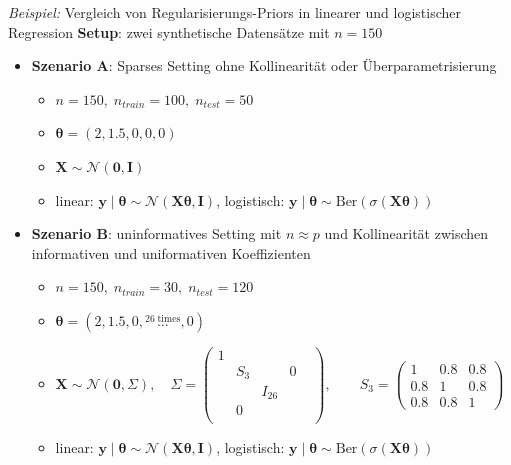 \documentclass[
  ignorenonframetext,
  aspectratio=169,
]{beamer}
\providecommand{\tightlist}{%
  \setlength{\itemsep}{0pt}\setlength{\parskip}{0pt}}
\newcommand{\bnull}{\bm{0}}
\newcommand{\by}{\bm{y}}
\newcommand{\bI}{\bm{I}}
\newcommand{\bX}{\bm{X}}
\newcommand{\Ncal}{\mathcal{N}}
\newcommand{\Sd}{\Sigma}
\newcommand{\btheta}{\bm{\theta}}
\begin{document}
\begin{frame}{\emph{Beispiel:} Vergleich von Regularisierungs-Priors in
linearer und logistischer Regression}
\protect{}\label{beispiel-vergleich-von-regularisierungs-priors-in-linearer-und-logistischer-regression}
\textbf{Setup}: zwei synthetische Datensätze mit \(n=150\)

\begin{itemize}
\tightlist
\item
  \textbf{Szenario A}: Sparses Setting ohne Kollinearität oder
  Überparametrisierung

  \begin{itemize}
  \tightlist
  \item
    \(n = 150,\; n_{train} = 100,\;n_{test} = 50\)
  \item
    \(\btheta = (2, 1.5, 0, 0, 0)\)
  \item
    \(\bX \sim \Ncal(\bnull, \bI)\)
  \item
    linear: \(\by \mid \btheta \sim \Ncal(\bX \btheta,\bI)\),
    logistisch:
    \(\by \mid \btheta \sim \text{Ber}(\sigma(\bX \btheta))\)
  \end{itemize}
\item
  \textbf{Szenario B}: uninformatives Setting mit \(n \approx p\) und
  Kollinearität zwischen informativen und uniformativen Koeffizienten

  \begin{itemize}
  \tightlist
  \item
    \(n = 150,\; n_{train} = 30,\;n_{test} = 120\)
  \item
    \(\btheta = (2, 1.5, 0, \overset{26\; \text{times}}{\dots}, 0)\)
  \item
    \(\bX \sim \Ncal(\bnull, \Sd), \quad \Sd = \begin{pmatrix} 1 &        &         &        &        \\ & \!\!S_3\!\! &        & 0      &        \\ &        & I_{26} &        &        \\ & 0      &        &        &        \\ \end{pmatrix}, \qquad S_3 = \begin{pmatrix} 1   & 0.8 & 0.8\\ 0.8 & 1   & 0.8\\ 0.8 & 0.8 & 1 \end{pmatrix}\)
  \item
    linear: \(\by \mid \btheta \sim \Ncal(\bX \btheta, \bI)\),
    logistisch:
    \(\by \mid \btheta \sim \text{Ber}(\sigma(\bX \btheta))\)
  \end{itemize}
\end{itemize}
\end{frame}
\end{document}
